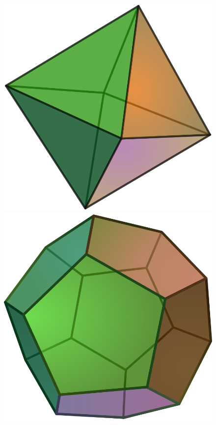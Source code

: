 \begin{multicols}{2}
\begin{figure}[H]
		\includegraphics[scale=0.07]{Octahedron.png}
		\includegraphics[scale=0.07]{Dodecahedron.png}

\end{figure}
\end{multicols}
